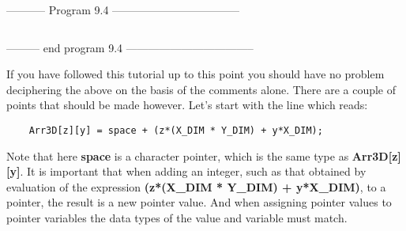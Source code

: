 -----------  Program 9.4  -----------------------------------
\inputminted{c}{../src/ch9-4.c}
--------- end program 9.4 -----------------------------------

If you have followed this tutorial up to this point you should have no
problem deciphering the above on the basis of the comments alone. There
are a couple of points that should be made however. Let's start with the
line which reads:

\begin{verbatim}
    Arr3D[z][y] = space + (z*(X_DIM * Y_DIM) + y*X_DIM);
\end{verbatim}

Note that here \textbf{space} is a character pointer, which is the same
type as \textbf{Arr3D{[}z{]}{[}y{]}}. It is important that when adding
an integer, such as that obtained by evaluation of the expression
\textbf{(z*(X\_DIM * Y\_DIM) + y*X\_DIM)}, to a pointer, the result is a
new pointer value. And when assigning pointer values to pointer
variables the data types of the value and variable must match.

\begin{comment}
\href{ch10x.htm}{Chapter 10: Pointers to Functions}

\href{pointers.htm}{Back to Table of Contents}
\end{comment}
